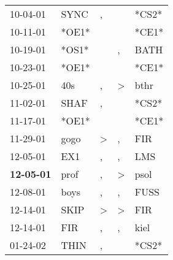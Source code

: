 \begin{supertabular}{p{0.07\textwidth}p{0.06\textwidth}p{0.02\textwidth}p{0.02\textwidth}p{0.06\textwidth}}
          10-04-01\textsuperscript{} &           SYNC\textsuperscript{} &                , &                  &                            *CS2* \\
          10-11-01\textsuperscript{} &                            *OE1* &                  &                  &                            *CE1* \\
          10-19-01\textsuperscript{} &                            *OS1* &                  &                , &           BATH\textsuperscript{} \\
          10-23-01\textsuperscript{} &                            *OE1* &                  &                  &                            *CE1* \\
          10-25-01\textsuperscript{} &            40s\textsuperscript{} &                , &     \textgreater &           bthr\textsuperscript{} \\
          11-02-01\textsuperscript{} &           SHAF\textsuperscript{} &                , &                  &                            *CS2* \\
          11-17-01\textsuperscript{} &                            *OE1* &                  &                  &                            *CE1* \\
          11-29-01\textsuperscript{} &           gogo\textsuperscript{} &     \textgreater &                , &            FIR\textsuperscript{} \\
          12-05-01\textsuperscript{} &            EX1\textsuperscript{} &                , &                , &            LMS\textsuperscript{} \\
 \textbf{12-05-01\textsuperscript{}} &           prof\textsuperscript{} &                , &     \textgreater &           psol\textsuperscript{} \\
          12-08-01\textsuperscript{} &           boys\textsuperscript{} &                , &                , &           FUSS\textsuperscript{} \\
          12-14-01\textsuperscript{} &           SKIP\textsuperscript{} &     \textgreater &     \textgreater &            FIR\textsuperscript{} \\
          12-14-01\textsuperscript{} &            FIR\textsuperscript{} &                , &                , &           kiel\textsuperscript{} \\
          01-24-02\textsuperscript{} &           THIN\textsuperscript{} &                , &                  &                            *CS2* \\

\end{supertabular}
